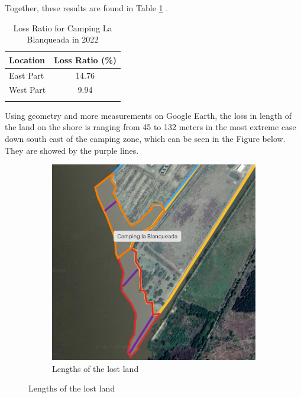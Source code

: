 Together, these results are found in Table \ref{Table:Loss Ratio for Camping La Blanqueada in 2022} .

\begin{table}[H]
\centering
\caption{Loss Ratio for Camping La Blanqueada in 2022}
\label{tab:LossRatio}
\begin{tabular}{l c}
\toprule
Location & Loss Ratio (\%) \\
\midrule
East Part & 14.76 \\
West Part & 9.94 \\
\bottomrule
\label{Table:Loss Ratio for Camping La Blanqueada in 2022}
\end{tabular}
\end{table}


Using geometry and more measurements on Google Earth, the loss in length of the land on the shore is ranging from 45 to 132 meters in the most extreme case down south east of the camping zone, which can be seen in the Figure below. They are showed by the purple lines.

\begin{figure}[H]
    \centering
    \begin{subfigure}[b]{0.48\textwidth}
        \includegraphics[width=\linewidth, height =6
        cm]{figures/appendix-g/length.png}
        \caption{Lengths of the lost land}
        \label{fig:second}
    \end{subfigure}
\end{figure}
